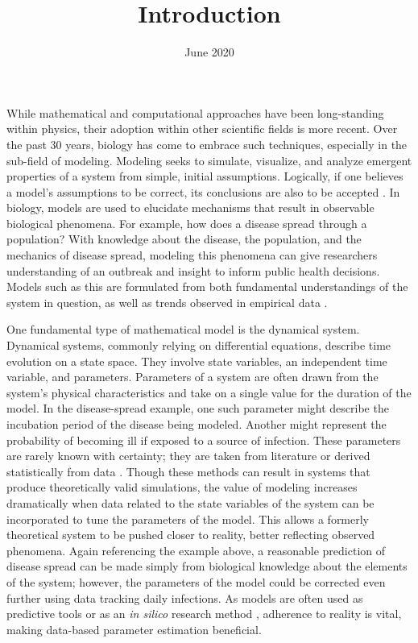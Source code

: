 \documentclass{article}
\title{Introduction}
\date{June 2020}
\begin{document}
\maketitle
While mathematical and computational approaches have been long-standing within physics, their adoption within other scientific fields is more recent. Over the past 30 years, biology has come to embrace such techniques, especially in the sub-field of modeling. Modeling seeks to simulate, visualize, and analyze emergent properties of a system from simple, initial assumptions\cite{biomodel}. Logically, if one believes a model's assumptions to be correct, its conclusions are also to be accepted \cite{bio_logic}. In biology, models are used to elucidate mechanisms that result in observable biological phenomena. For example, how does a disease spread through a population? With knowledge about the disease, the population, and the mechanics of disease spread, modeling this phenomena can give researchers understanding of an outbreak and insight to inform public health decisions. Models such as this are formulated from both fundamental understandings of the system in question, as well as trends observed in empirical data \cite{biomodel}. 
\par One fundamental type of mathematical model is the dynamical system. Dynamical systems, commonly relying on differential equations, describe time evolution on a state space. They involve state variables, an independent time variable, and parameters. Parameters of a system are often drawn from the system's physical characteristics and take on a single value for the duration of the model. In the disease-spread example, one such parameter might describe the incubation period of the disease being modeled. Another might represent the probability of becoming ill if exposed to a source of infection. These parameters are rarely known with certainty; they are taken from literature or derived statistically from data \cite{biomodel}. Though these methods can result in systems that produce theoretically valid simulations, the value of modeling increases dramatically when data related to the state variables of the system can be incorporated to tune the parameters of the model. This allows a formerly theoretical system to be pushed closer to reality, better reflecting observed phenomena. Again referencing the example above, a reasonable prediction of disease spread can be made simply from biological knowledge about the elements of the system; however, the parameters of the model could be corrected even further using data tracking daily infections. As models are often used as predictive tools or as an \emph{in silico} research method \cite{biomodel}, adherence to reality is vital, making data-based parameter estimation beneficial.
\end{document}
